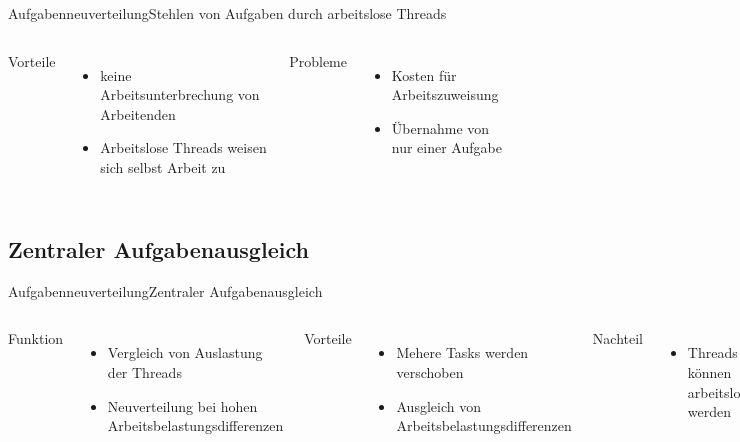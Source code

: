 \documentclass{beamer}
\begin{document}
\begin{frame}{Aufgabenneuverteilung}{Stehlen von Aufgaben durch arbeitslose Threads}
\begin{columns}

        Vorteile
        \begin{itemize}
        \item keine Arbeitsunterbrechung von Arbeitenden
        \item Arbeitslose Threads weisen sich selbst Arbeit zu
        \end{itemize}

        
        
        
        
        Probleme
        \begin{itemize}
        \item Kosten f\"ur Arbeitszuweisung
        \item \"Ubernahme von nur einer Aufgabe
        \end{itemize}
    
\end{columns}
\end{frame}


\subsection{Zentraler Aufgabenausgleich}


\begin{frame}{Aufgabenneuverteilung}{Zentraler Aufgabenausgleich}
\begin{columns}

        Funktion
        \begin{itemize}
        \item Vergleich von Auslastung der Threads
        \item Neuverteilung bei hohen Arbeitsbelastungsdifferenzen
        \end{itemize}

        
        
        
        
        Vorteile
        \begin{itemize}
        \item Mehere Tasks werden verschoben
        \item Ausgleich von Arbeitsbelastungsdifferenzen
        \end{itemize}
        
        Nachteil
        \begin{itemize}
        \item Threads k\"onnen arbeitslos werden
        \end{itemize}
    
\end{columns}
\end{frame}
\end{document}
